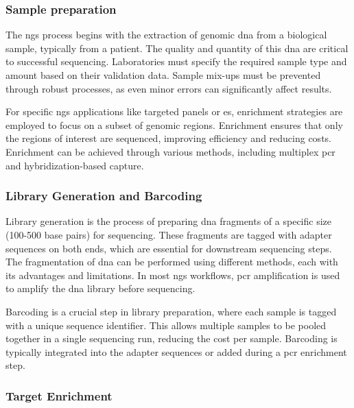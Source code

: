 \subsubsection{\textbf{Sample preparation}} \label{subsubsec:ngs_sample}

The \ac{ngs} process begins with the extraction of genomic \ac{dna} from a biological sample, typically from a patient. The quality and quantity of this \ac{dna} are critical to successful sequencing. Laboratories must specify the required sample type and amount based on their validation data. Sample mix-ups must be prevented through robust processes, as even minor errors can significantly affect results. \cite{Rehm2013}

For specific \ac{ngs} applications like targeted panels or \ac{es}, enrichment strategies are employed to focus on a subset of genomic regions. Enrichment ensures that only the regions of interest are sequenced, improving efficiency and reducing costs. Enrichment can be achieved through various methods, including multiplex \ac{pcr} and hybridization-based capture. \cite{Rehm2013}

\subsubsection{\textbf{Library Generation and Barcoding}} \label{subsubsec:ngs_library}

Library generation is the process of preparing \ac{dna} fragments of a specific size (100-500 base pairs) for sequencing. These fragments are tagged with adapter sequences on both ends, which are essential for downstream sequencing steps. The fragmentation of \ac{dna} can be performed using different methods, each with its advantages and limitations. In most \ac{ngs} workflows, \ac{pcr} amplification is used to amplify the \ac{dna} library before sequencing. \cite{Rehm2013}

Barcoding is a crucial step in library preparation, where each sample is tagged with a unique sequence identifier. This allows multiple samples to be pooled together in a single sequencing run, reducing the cost per sample. Barcoding is typically integrated into the adapter sequences or added during a \ac{pcr} enrichment step. \cite{Rehm2013}

\subsubsection{\textbf{Target Enrichment}} \label{subsubsec:ngs_enrichment}

